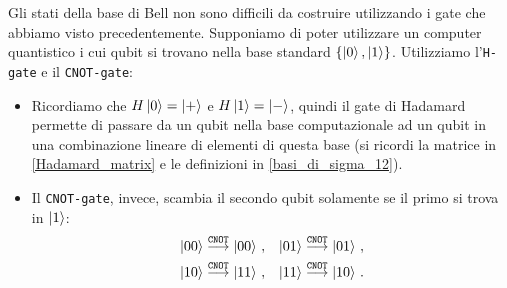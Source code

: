 \noindent Gli stati della base di Bell non sono difficili da costruire utilizzando i gate che abbiamo visto precedentemente. Supponiamo di poter utilizzare un computer quantistico i cui qubit si trovano nella base standard $\lbrace \ket{0}, \ket{1} \rbrace$. Utilizziamo l'\texttt{H-gate} e il \texttt{CNOT-gate}: 
\begin{itemize}
    \item Ricordiamo che $H\ket{0} = \ket{+}$ e $H \ket{1} = \ket{-}$, quindi il gate di Hadamard permette di passare da un qubit nella base computazionale ad un qubit in una combinazione lineare di elementi di questa base (si ricordi la matrice in \eqref{Hadamard_matrix} e le definizioni in \eqref{basi_di_sigma_12}). 
    
    \item Il \texttt{CNOT-gate}, invece, scambia il secondo qubit solamente se il primo si trova in $\ket{1}$:
    \begin{align*}
    \ket{00} &\overset{\texttt{CNOT}}{\longrightarrow} \ket{00} \, , &\ket{01} &\overset{\texttt{CNOT}}{\longrightarrow} \ket{01} \, , \\
    \ket{10} &\overset{\texttt{CNOT}}{\longrightarrow} \ket{11} \, , &\ket{11} &\overset{\texttt{CNOT}}{\longrightarrow} \ket{10} \, .
\end{align*}
\end{itemize}

